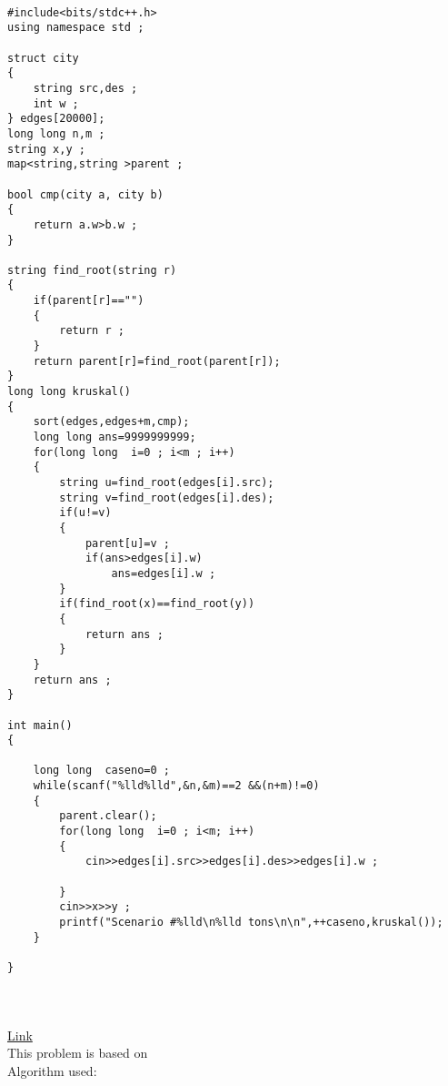 \documentclass{article}
\begin{document}
\begin{lstlisting}[style=cppStyle]

#include<bits/stdc++.h>
using namespace std ;

struct city
{
    string src,des ;
    int w ;
} edges[20000];
long long n,m ;
string x,y ;
map<string,string >parent ;

bool cmp(city a, city b)
{
    return a.w>b.w ;
}

string find_root(string r)
{
    if(parent[r]=="")
    {
        return r ;
    }
    return parent[r]=find_root(parent[r]);
}
long long kruskal()
{
    sort(edges,edges+m,cmp);
    long long ans=9999999999;
    for(long long  i=0 ; i<m ; i++)
    {
        string u=find_root(edges[i].src);
        string v=find_root(edges[i].des);
        if(u!=v)
        {
            parent[u]=v ;
            if(ans>edges[i].w)
                ans=edges[i].w ;
        }
        if(find_root(x)==find_root(y))
        {
            return ans ;
        }
    }
    return ans ;
}

int main()
{

    long long  caseno=0 ;
    while(scanf("%lld%lld",&n,&m)==2 &&(n+m)!=0)
    {
        parent.clear();
        for(long long  i=0 ; i<m; i++)
        {
            cin>>edges[i].src>>edges[i].des>>edges[i].w ;

        }
        cin>>x>>y ;
        printf("Scenario #%lld\n%lld tons\n\n",++caseno,kruskal());
    }

}


\end{lstlisting}






\section{} \href{}{Link} \\

This problem is based on  \textbf{   }\\
Algorithm used: \textbf{}\\

\begin{lstlisting}[style=cppStyle]
\end{lstlisting}




% 
% 
\end{document}
